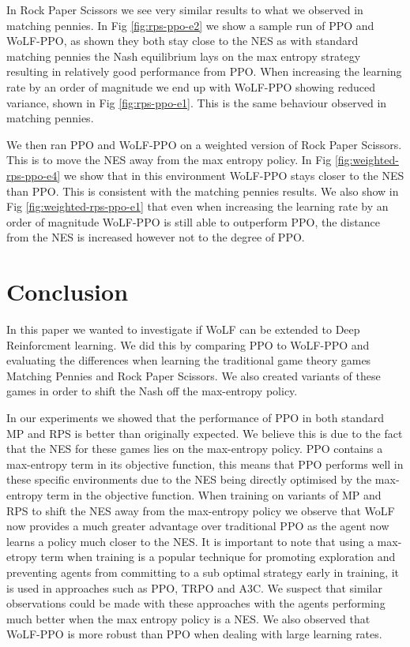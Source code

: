\documentclass[conference]{IEEEtran}
\begin{document}
In Rock Paper Scissors we see very similar results to what we observed in matching pennies. In Fig \ref{fig:rps-ppo-e2} we show a sample run of PPO and WoLF-PPO, as shown they both stay close to the NES as with standard matching pennies the Nash equilibrium lays on the max entropy strategy resulting in relatively good performance from PPO. When increasing the learning rate by an order of magnitude we end up with WoLF-PPO showing reduced variance, shown in Fig \ref{fig:rps-ppo-e1}. This is the same behaviour observed in matching pennies.

We then ran PPO and WoLF-PPO on a weighted version of Rock Paper Scissors. This is to move the NES away from the max entropy policy. In Fig \ref{fig:weighted-rps-ppo-e4} we show that in this environment WoLF-PPO stays closer to the NES than PPO. This is consistent with the matching pennies results. We also show in Fig \ref{fig:weighted-rps-ppo-e1} that even when increasing the learning rate by an order of magnitude WoLF-PPO is still able to outperform PPO, the distance from the NES is increased however not to the degree of PPO.

\section{Conclusion}


In this paper we wanted to investigate if WoLF can be extended to Deep Reinforcment learning. We did this by comparing PPO to WoLF-PPO and evaluating the differences when learning the traditional game theory games Matching Pennies and Rock Paper Scissors. We also created variants of these games in order to shift the Nash off the max-entropy policy.

In our experiments we showed that the performance of PPO in both standard MP and RPS is better than originally expected. We believe this is due to the fact that the NES for these games lies on the max-entropy policy. PPO contains a max-entropy term in its objective function, this means that PPO performs well in these specific environments due to the NES being directly optimised by the max-entropy term in the objective function. When training on variants of MP and RPS to shift the NES away from the max-entropy policy we observe that WoLF now provides a much greater advantage over traditional PPO as the agent now learns a policy much closer to the NES. It is important to note that using a max-etropy term when training is a popular technique for promoting exploration and preventing agents from committing to a sub optimal strategy early in training, it is used in approaches such as PPO, TRPO and A3C. We suspect that similar observations could be made with these approaches with the agents performing much better when the max entropy policy is a NES. We also observed that WoLF-PPO is more robust than PPO when dealing with large learning rates.
\end{document}
